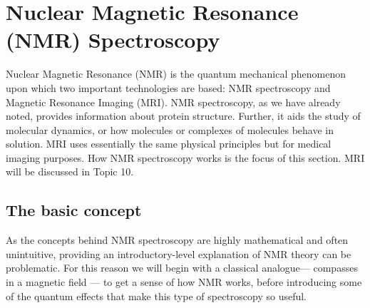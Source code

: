 \section{Nuclear Magnetic Resonance (NMR) Spectroscopy}

Nuclear Magnetic Resonance (NMR) is the quantum mechanical phenomenon upon which two important technologies are based: NMR spectroscopy and Magnetic Resonance Imaging (MRI).  NMR spectroscopy, as we have already noted, provides information about protein structure.  Further, it aids the study of molecular dynamics, or how molecules or complexes of molecules behave in solution.  MRI uses essentially the same physical principles but for medical imaging purposes.  How NMR spectroscopy works is the focus of this section.  MRI will be discussed in Topic 10.

\subsection{The basic concept}

As the concepts behind NMR spectroscopy are highly mathematical and often unintuitive, providing an introductory-level explanation of NMR theory can be problematic.  For this reason we will begin with a classical analogue— compasses in a magnetic field — to get a sense of how NMR works, before introducing some of the quantum effects that make this type of spectroscopy so useful.

